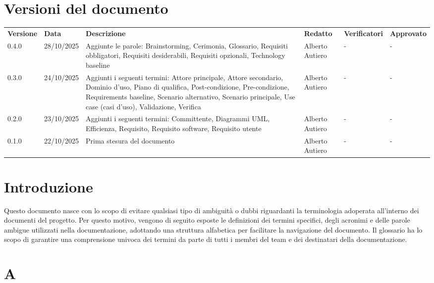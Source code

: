 \documentclass[a4paper,11pt]{article}
\begin{document}
\newpage

\tableofcontents

\newpage

\section{Versioni del documento}

{\footnotesize
\begin{tabular}{|p{1.5cm}|p{1.8cm}|p{4cm}|p{2cm}|p{2cm}|p{2cm}|}
\hline
\textbf{Versione} & \textbf{Data} & \textbf{Descrizione} & \textbf{Redatto} & \textbf{Verificatori} & \textbf{Approvato} \\
0.4.0 & 28/10/2025 & Aggiunte le parole: Brainstorming, Cerimonia, Glossario, Requisiti obbligatori, Requisiti desiderabili, Requisiti opzionali, Technology baseline & Alberto Autiero & - & - \\
\hline
0.3.0 & 24/10/2025 & Aggiunti i seguenti termini: Attore principale, Attore secondario, Dominio d'uso, Piano di qualifica, Post-condizione, Pre-condizione, Requirements baseline, Scenario alternativo, Scenario principale, Use case (casi d'uso), Validazione, Verifica & Alberto Autiero & - & - \\
\hline
0.2.0 & 23/10/2025 & Aggiunti i seguenti termini: Committente, Diagrammi UML, Efficienza, Requisito, Requisito software, Requisito utente & Alberto Autiero & - & - \\
\hline
0.1.0 & 22/10/2025 & Prima stesura del documento & Alberto Autiero & - & - \\
\hline
\end{tabular}
}

\newpage

\section{Introduzione}
Questo documento nasce con lo scopo di evitare qualsiasi tipo di ambiguità o dubbi riguardanti la terminologia adoperata all'interno dei documenti del progetto. Per questo motivo, vengono di seguito esposte le definizioni dei termini specifici, degli acronimi e delle parole ambigue utilizzati nella documentazione, adottando una struttura alfabetica per facilitare la navigazione del documento. Il glossario ha lo scopo di garantire una comprensione univoca dei termini da parte di tutti i membri del team e dei destinatari della documentazione.

\newpage

\section{A}
\end{document}
